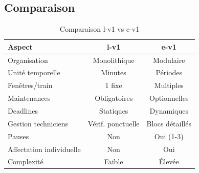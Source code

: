 \subsection{Comparaison}

\begin{table}[h]
	\centering
	\small
	\begin{tabular}{|l|c|c|}
		\hline
		\textbf{Aspect}          & \textbf{l-v1}     & \textbf{e-v1}   \\
		\hline
		Organisation             & Monolithique      & Modulaire       \\
		Unité temporelle         & Minutes           & Périodes        \\
		Fenêtres/train           & 1 fixe            & Multiples       \\
		Maintenances             & Obligatoires      & Optionnelles    \\
		Deadlines                & Statiques         & Dynamiques      \\
		Gestion techniciens      & Vérif. ponctuelle & Blocs détaillés \\
		Pauses                   & Non               & Oui (1-3)       \\
		Affectation individuelle & Non               & Oui             \\
		Complexité               & Faible            & Élevée          \\
		\hline
	\end{tabular}
	\caption{Comparaison l-v1 vs e-v1}
	\label{tab:comparaison-modeles}
\end{table}
